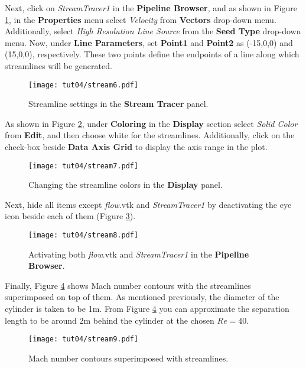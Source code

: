 Next, click on \textit{StreamTracer1} in the \textbf{Pipeline Browser}, and as shown in Figure \ref{fig4:stream6_4}, in the \textbf{Properties} menu select \textit{Velocity} from \textbf{Vectors} drop-down menu. Additionally, select \textit{High Resolution Line Source} from the \textbf{Seed Type} drop-down menu. Now, under \textbf{Line Parameters}, set \textbf{Point1} and \textbf{Point2} as (-15,0,0) and (15,0,0), respectively. These two points define the endpoints of a line along which streamlines will be generated.  
\begin{figure}[htbp]
    \centering
    \texttt{[image: tut04/stream6.pdf]}
    \caption{Streamline settings in the \textbf{Stream Tracer} panel.}
    \label{fig4:stream6_4}
\end{figure}
As shown in Figure \ref{fig4:stream7_4}, under \textbf{Coloring} in the \textbf{Display} section select \textit{Solid Color} from \textbf{Edit}, and then choose white for the streamlines. Additionally, click on the check-box beside \textbf{Data Axis Grid} to display the axis range in the plot.
\begin{figure}[htbp]
    \centering
    \texttt{[image: tut04/stream7.pdf]}
    \caption{Changing the streamline colors in the \textbf{Display} panel.}
    \label{fig4:stream7_4}
\end{figure}
Next, hide all items except \textit{flow}.vtk and \textit{StreamTracer1} by deactivating the eye icon beside each of them (Figure \ref{fig4:stream8_4}).
\begin{figure}[htbp]
    \centering
    \texttt{[image: tut04/stream8.pdf]}
    \caption{Activating both \textit{flow}.vtk and \textit{StreamTracer1} in the \textbf{Pipeline Browser}.}
    \label{fig4:stream8_4}
\end{figure}
Finally, Figure \ref{fig4:stream9_4} shows Mach number contours with the streamlines superimposed on top of them. As mentioned previously, the diameter of the cylinder is taken to be 1m. From Figure \ref{fig4:stream9_4} you can approximate the separation length to be around 2m behind the cylinder at the chosen $Re=40$.
\begin{figure}[htbp]
    \centering
    \texttt{[image: tut04/stream9.pdf]}
    \caption{Mach number contours superimposed with streamlines.}
    \label{fig4:stream9_4}
\end{figure}

